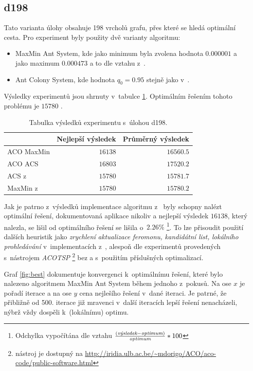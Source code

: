 \documentclass[a4paper, 12pt]{article}
\begin{document}
\subsection{d198}
Tato varianta úlohy obsahuje 198 vrcholů grafu, přes které se hledá optimální cesta. Pro experiment byly použity dvě varianty algoritmu:
\begin{itemize}
  \item MaxMin Ant System, kde jako minimum byla zvolena hodnota $0.000001$ a jako maximum $0.000473$ a to dle vztahu z~\cite{aco:maxmintsp}.
  \item Ant Colony System, kde hodnota $q_0=0.95$ stejně jako v~\cite{aco:acs}.
\end{itemize}
Výsledky experimentů jsou shrnuty v~tabulce \ref{tabd198}. Optimálním řešením tohoto problému je $15 780$ \cite{aco:acs}.
\begin{table}[tb]
\begin{center}
  \begin{tabular}{ | l | r | r |}
   \hline
    & \textbf{Nejlepší výsledek} & \textbf{Průměrný výsledek} \\ \hline \hline
    ACO MaxMin & $16138$ & $16560.5$ \\ \hline
    ACO ACS & $16803$ & $17520.2$ \\ \hline
    ACS z~\cite{aco:acs} & $15 780$ & $15 781.7$ \\ \hline
    MaxMin z~\cite{aco:maxmintsp} & $15 780$ & $15 780.2$\\ \hline
   \end{tabular}
   \caption{Tabulka výsledků experimentu s~úlohou d198.}
   \label{tabd198}
\end{center}
\end{table}
Jak je patrno z~výsledků implementace algoritmu z~\cite{aco:maxmintsp,aco:acs} byly schopny nalézt optimální řešení, dokumentovaná aplikace nikoliv a nejlepší
výsledek $16138$, který nalezla, se lišil
od optimálního řešení se lišila o~$2.26\%$ \footnote{Odchylka vypočítána dle vztahu $\frac{(\emph{výsledek}-\emph{optimum})}{\emph{optimum}}*100$}. To lze
přisoudit použití dalších heuristik jako \emph{zrychlení aktualizace feromonu, kandidátní list, lokálního prohledávání}
v~implementacích z~\cite{aco:maxmintsp,aco:acs}, alespoň dle experimentů provedených s~nástrojem \emph{ACOTSP} \footnote{nástroj je dostupný na
\url{http://iridia.ulb.ac.be/~mdorigo/ACO/aco-code/public-software.html}} bez a s~použitím příslušných optimalizací.

Graf \ref{fig:best} dokumentuje konvergenci k~optimálnímu řešení, které bylo nalezeno algoritmem MaxMin Ant System během jednoho z~pokusů.
Na ose $x$ je pořadí iterace a na ose $y$ cena nejlešího řešení v~dané iteraci. Je patrné, že přibližně od 500. iterace již mravenci v~další iteracích lepší řešení
nenacházeli, nýbrž vždy dospěli k~(lokálnímu) optimu.
\end{document}
